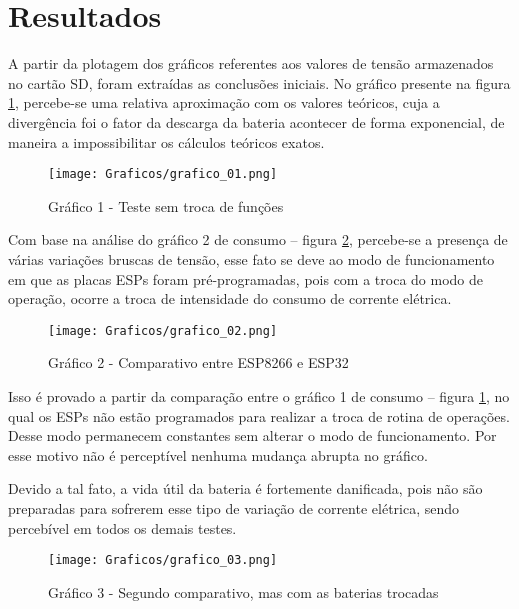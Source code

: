 \newpage
\section{Resultados}
\label{sc:resultados_}

{
A partir da plotagem dos gráficos referentes aos valores de tensão armazenados no cartão SD, foram extraídas as conclusões iniciais. No gráfico presente na figura \ref{fig:grafico_results_01}, percebe-se uma relativa aproximação com os valores teóricos, cuja a divergência foi o fator da descarga da bateria acontecer de forma exponencial, de maneira a impossibilitar os cálculos teóricos exatos.
}

\begin{figure}[htp]
    \centering
    \texttt{[image: Graficos/grafico\_01.png]}
    \caption{Gráfico 1 - Teste sem troca de funções}
    \label{fig:grafico_results_01}
\end{figure}

{
Com base na análise do gráfico 2 de consumo – figura \ref{fig:grafico_results_02}, percebe-se a presença de várias variações bruscas de tensão, esse fato se deve ao modo de funcionamento em que as placas ESPs foram pré-programadas, pois com a troca do modo de operação, ocorre a troca de intensidade do consumo de corrente elétrica. 
}

\begin{figure}[htp]
    \centering
    \texttt{[image: Graficos/grafico\_02.png]}
    \caption{Gráfico 2 - Comparativo entre ESP8266 e ESP32}
    \label{fig:grafico_results_02}
\end{figure}

{
Isso é provado a partir da comparação entre o gráfico 1 de consumo – figura \ref{fig:grafico_results_01}, no qual os ESPs não estão programados para realizar a troca de rotina de operações. Desse modo permanecem constantes sem alterar o modo de funcionamento. Por esse motivo não é perceptível nenhuma mudança abrupta no gráfico.
}

{
Devido a tal fato, a vida útil da bateria é fortemente danificada, pois não são preparadas para sofrerem esse tipo de variação de corrente elétrica, sendo percebível em todos os demais testes.
}

\begin{figure}[htp]
    \centering
    \texttt{[image: Graficos/grafico\_03.png]}
    \caption{Gráfico 3 - Segundo comparativo, mas com as baterias trocadas}
    \label{fig:grafico_results_03}
\end{figure}

